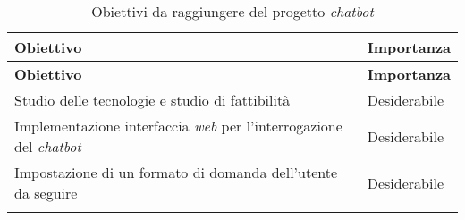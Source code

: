 \begin{longtable}{|p{10cm}|p{2cm}|}
    \hline
    \rowcolor{tableheader}\textbf{Obiettivo} & \textbf{Importanza} \\
    \hline
    \endfirsthead

    \rowcolor{tableheader}\textbf{Obiettivo} & \textbf{Importanza} \\
    \hline
    \endhead

    \hline
    \endfoot

    \hline
    \endlastfoot
    \rowcolor{tableoddrow} Studio delle tecnologie e studio di fattibilità & Desiderabile \\
    \hline
    \rowcolor{tableevenrow} Implementazione interfaccia \textit{web} per l'interrogazione del \textit{chatbot} & Desiderabile \\
    \hline
    \rowcolor{tableoddrow} Impostazione di un formato di domanda dell'utente da seguire & Desiderabile \\
    \hline
    \caption{Obiettivi da raggiungere del progetto \textit{chatbot}}
    \label{tab:obiettiviChatbot}
\end{longtable}

